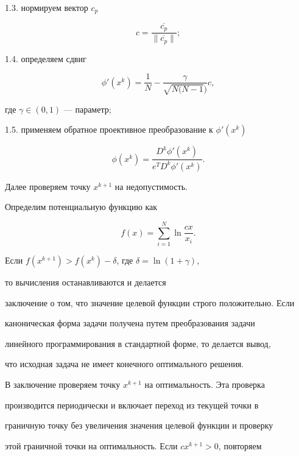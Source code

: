 1.3. нормируем вектор $c_p$


$$


c=\frac{\overline{c_p}}{\|\overline{c_p}\|};


$$





1.4. определяем сдвиг


$$


\phi'(x^k)=\frac{1}{N}-\frac{\gamma}{\sqrt{N(N-1})}{c},


$$


где $\gamma\in (0,1)$ --- параметр;





1.5. применяем обратное проективное преобразование к $\phi'(x^k)$


$$


\phi(x^k) = \frac{D^k\phi'(x^k)}{e^TD^k\phi'(x^k)}.


$$





Далее проверяем точку $x^{k+1}$ на недопустимость.





Определим потенциальную функцию как


$$


f(x)=\sum\limits^N_{i=1}\ln\frac{cx}{x_i}.


$$


Если $f(x^{k+1})>f(x^k)-\delta$, где $\delta = \ln(1+\gamma)$,


то вычисления останавливаются и делается


заключение о том, что значение целевой функции строго положительно. Если


каноническая форма задачи получена путем преобразования задачи


линейного программирования в стандартной форме, то делается вывод,


что исходная задача не имеет конечного оптимального решения.





В заключение проверяем точку $x^{k+1}$ на оптимальность. Эта проверка


производится периодически и включает переход из текущей точки в


граничную точку без увеличения значения целевой функции и проверку


этой граничной точки на оптимальность. Если $cx^{k+1} > 0$, повторяем


